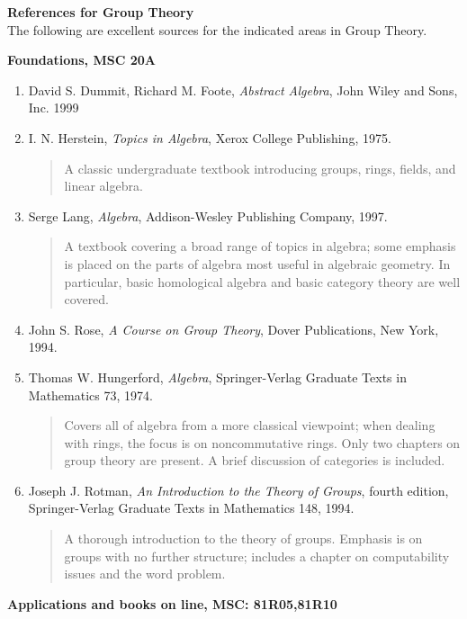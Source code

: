 \documentclass[12pt]{article}
\begin{document}
{\bf References for Group Theory}\\
The following are excellent sources for the indicated areas in Group Theory.

{\bf Foundations, MSC 20A}
\begin{enumerate}
\item David S. Dummit, Richard M. Foote, \emph{Abstract Algebra}, John Wiley and Sons, Inc. 1999

\item I. N. Herstein, \emph{Topics in Algebra}, Xerox College Publishing, 1975.
\begin{quote}A classic undergraduate textbook introducing groups, rings, fields, and linear algebra.\end{quote}  


\item Serge Lang, \emph{Algebra}, Addison-Wesley Publishing Company, 1997. 
\begin{quote}A textbook covering a broad range of topics in algebra; some emphasis is placed on the parts of algebra most useful in algebraic geometry.  In particular, basic homological algebra and basic category theory are well covered.
\end{quote}  

\item John S. Rose, \emph{A Course on Group Theory}, Dover Publications, New York, 1994.

\item Thomas W. Hungerford, \emph{Algebra}, Springer-Verlag Graduate Texts in Mathematics 73, 1974.  
\begin{quote}
Covers all of algebra from a more classical viewpoint; when dealing with rings, the focus is on noncommutative rings.  Only two chapters on group theory are present.  A brief discussion of categories is included. 
\end{quote}
\item Joseph J. Rotman, \emph{An Introduction to the Theory of Groups}, fourth edition, Springer-Verlag Graduate Texts in Mathematics 148, 1994.  
\begin{quote}
A thorough introduction to the theory of groups.  Emphasis is on groups with no further structure; includes a chapter on computability issues and the word problem.
\end{quote}
\end{enumerate}


{\bf Applications and books on line, MSC: 81R05,81R10}
\end{document}
